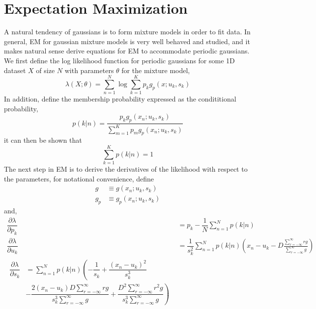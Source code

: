 \documentclass{acm_proc_article-sp}
\begin{document}
\section{Expectation Maximization}

A natural tendency of gaussians is to form mixture models in order to fit data. In general, EM for gaussian mixture models is very well behaved and studied, and it makes natural sense derive equations for EM to accommodate periodic gaussians. We first define the log likelihood function for periodic gaussians for some 1D dataset \textbf{$X$} of size \textbf{$N$} with parameters \textbf{$\theta$} for the mixture model,
\begin{equation}
\lambda(X; \theta) = \sum_{n=1}^{N} \log \sum_{k=1}^{K} p_k g_p(x;u_k, s_k)
\end{equation}
In addition, define the membership probability expressed as the condititional probability,
\begin{equation}
p(k|n) = \dfrac{p_k g_p(x_n; u_k, s_k)}{\sum\limits^{K}_{m=1} p_m g_p(x_n; u_k, s_k)}
\end{equation}
it can then be shown that
\begin{equation}
\sum_{k=1}^{K} p(k|n) = 1
\end{equation}
The next step in EM is to derive the derivatives of the likelihood with respect to the parameters, for notational convenience, define
\begin{align}
g & \equiv g(x_n; u_k, s_k) \\
g_p & \equiv g_p(x_n; u_k, s_k)
\end{align}
and,
\begin{align}
\dfrac{\partial \lambda}{\partial p_k} & = p_k - \dfrac{1}{N} \sum\limits^{N}_{n=1}p(k|n) \\
\dfrac{\partial \lambda}{\partial u_k} &= \dfrac{1}{s_k^2} \sum_{n=1}^{N}p(k|n) \left(x_n - u_k - D \frac{\sum\limits^{\infty}_{r=-\infty} rg}{\sum\limits^{\infty}_{r=-\infty}g} \right) \\
\begin{split}
\dfrac{\partial \lambda}{\partial s_k} & = \sum\limits^{N}_{n=1}p(k|n) \left(-\dfrac{1}{s_k} + \dfrac{(x_n-u_k)^2}{s_k^3}\right. \\
&\left. -\dfrac{2(x_n-u_k)D\sum\limits^{\infty}_{r=-\infty}rg}{s_k^3 \sum\limits^{\infty}_{r=-\infty}g} + \dfrac{D^2 \sum\limits^{\infty}_{r=-\infty}r^2g}{s_k^3 \sum\limits^{\infty}_{r=-\infty}g} \right)
\end{split}
\end{align}
\end{document}
